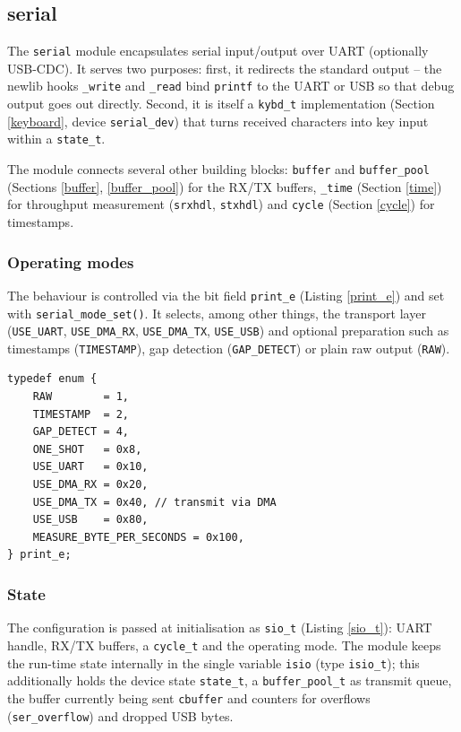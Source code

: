 \subsection{serial}\label{serial}
The \verb|serial| module encapsulates serial input/output over UART
(optionally USB-CDC). It serves two purposes: first, it redirects the standard
output -- the newlib hooks \verb|_write| and \verb|_read| bind \verb|printf| to
the UART or USB so that debug output goes out directly. Second, it is itself a
\verb|kybd_t| implementation (Section \ref{keyboard}, device \verb|serial_dev|)
that turns received characters into key input within a \verb|state_t|.

The module connects several other building blocks: \verb|buffer| and
\verb|buffer_pool| (Sections \ref{buffer}, \ref{buffer_pool}) for the RX/TX
buffers, \verb|_time| (Section \ref{time}) for throughput measurement
(\verb|srxhdl|, \verb|stxhdl|) and \verb|cycle| (Section \ref{cycle}) for
timestamps.

\subsubsection*{Operating modes}
The behaviour is controlled via the bit field \verb|print_e| (Listing
\ref{print_e}) and set with \verb|serial_mode_set()|. It selects, among other
things, the transport layer (\verb|USE_UART|, \verb|USE_DMA_RX|,
\verb|USE_DMA_TX|, \verb|USE_USB|) and optional preparation such as timestamps (\verb|TIMESTAMP|),
gap detection (\verb|GAP_DETECT|) or plain raw output (\verb|RAW|).

\begin{listing}
\begin{verbatim}
typedef enum {
    RAW        = 1,
    TIMESTAMP  = 2,
    GAP_DETECT = 4,
    ONE_SHOT   = 0x8,
    USE_UART   = 0x10,
    USE_DMA_RX = 0x20,
    USE_DMA_TX = 0x40, // transmit via DMA
    USE_USB    = 0x80,
    MEASURE_BYTE_PER_SECONDS = 0x100,
} print_e;
\end{verbatim}
\caption{Output operating modes \texttt{print\_e}}
\label{print_e}
\end{listing}

\subsubsection*{State}
The configuration is passed at initialisation as \verb|sio_t| (Listing
\ref{sio_t}): UART handle, RX/TX buffers, a \verb|cycle_t| and the operating
mode. The module keeps the run-time state internally in the single variable
\verb|isio| (type \verb|isio_t|); this additionally holds the device state
\verb|state_t|, a \verb|buffer_pool_t| as transmit queue, the buffer
currently being sent \verb|cbuffer| and counters for overflows
(\verb|ser_overflow|) and dropped USB bytes.

